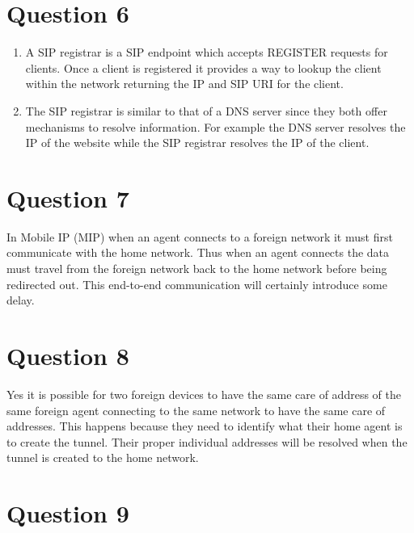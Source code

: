 \documentclass[fleqn, 12pt]{article}
\begin{document}
\section*{Question 6}

\begin{enumerate}
    \item
        A SIP registrar is a SIP endpoint which accepts REGISTER requests for clients. Once a client is registered it provides a way to lookup the client within the network returning the IP and SIP URI for the client.

    \item
        The SIP registrar is similar to that of a DNS server since they both offer mechanisms to resolve information. For example the DNS server resolves the IP of the website while the SIP registrar resolves the IP of the client.
\end{enumerate}

\section*{Question 7}

In Mobile IP (MIP) when an agent connects to a foreign network it must first communicate with the home network. Thus when an agent connects the data must travel from the foreign network back to the home network before being redirected out. This end-to-end communication will certainly introduce some delay.

\section*{Question 8}

Yes it is possible for two foreign devices to have the same care of address of the same foreign agent connecting to the same network to have the same care of addresses. This happens because they need to identify what their home agent is to create the tunnel. Their proper individual addresses will be resolved when the tunnel is created to the home network.

\section*{Question 9}
\end{document}
